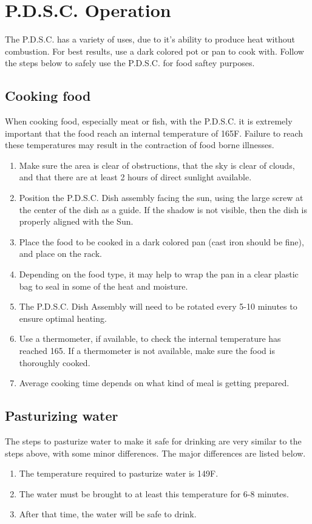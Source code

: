 \documentclass{article}
\begin{document}
    \section{P.D.S.C. Operation}
        The P.D.S.C. has a variety of uses, due to it's ability to produce heat without combustion.  For best results, use a dark colored pot or pan to cook with.
        Follow the steps below to safely use the P.D.S.C. for food saftey purposes.

        \subsection{Cooking food}
        When cooking food, especially meat or fish, with the P.D.S.C. it is extremely important that the food reach an internal temperature of 165\degree F.  Failure to reach these temperatures
        may result in the contraction of food borne illnesses.
            \begin{enumerate}
                \item Make sure the area is clear of obstructions, that the sky is clear of clouds, and that there are at least 2 hours of direct sunlight available.
                \item Position the P.D.S.C. Dish assembly facing the sun, using the large screw at the center of the dish as a guide.  If the shadow is not visible, then the dish is properly aligned with the Sun.
                \item Place the food to be cooked in a dark colored pan (cast iron should be fine), and place on the rack.
                \item Depending on the food type, it may help to wrap the pan in a clear plastic bag to seal in some of the heat and moisture.
                \item The P.D.S.C. Dish Assembly will need to be rotated every 5-10 minutes to ensure optimal heating.
                \item Use a thermometer, if available, to check the internal temperature has reached 165\degree.  If a thermometer is not available, make sure the food is thoroughly cooked.
                \item Average cooking time depends on what kind of meal is getting prepared.
            \end{enumerate}
        \subsection{Pasturizing water}
        The steps to pasturize water to make it safe for drinking are very similar to the steps above, with some minor differences.
        The major differences are listed below.
            \begin{enumerate}
                \item The temperature required to pasturize water is 149\degree F.
                \item The water must be brought to at least this temperature for 6-8 minutes.
                \item After that time, the water will be safe to drink.
            \end{enumerate}
\end{document}
